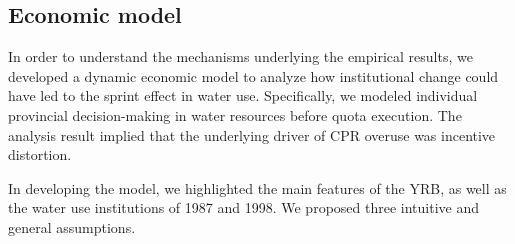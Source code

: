 \subsection{Economic model}
In order to understand the mechanisms underlying the empirical results, we developed a dynamic economic model to analyze how institutional change could have led to the sprint effect in water use. Specifically, we modeled individual provincial decision-making in water resources before quota execution. The analysis result implied that the underlying driver of CPR overuse was incentive distortion.

In developing the model, we highlighted the main features of the YRB, as well as the water use institutions of 1987 and 1998. We proposed three intuitive and general assumptions.
